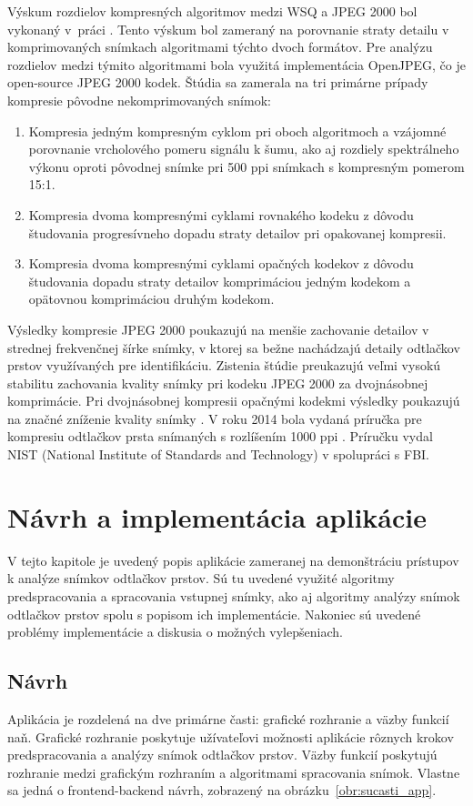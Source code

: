   Výskum rozdielov kompresných algoritmov medzi WSQ a JPEG 2000 bol vykonaný v~práci \cite{Libert}. Tento výskum bol zameraný na porovnanie straty detailu
  v komprimovaných snímkach algoritmami týchto dvoch formátov. Pre analýzu rozdielov medzi týmito algoritmami bola využitá implementácia OpenJPEG,
  čo je open-source JPEG 2000 kodek. Štúdia sa zamerala na tri primárne prípady kompresie pôvodne nekomprimovaných snímok:
  \begin{enumerate}
    \item Kompresia jedným kompresným cyklom pri oboch algoritmoch a vzájomné porovnanie vrcholového pomeru signálu k šumu, ako aj rozdiely spektrálneho
          výkonu oproti pôvodnej snímke pri 500 ppi snímkach s kompresným pomerom 15:1.
    \item Kompresia dvoma kompresnými cyklami rovnakého kodeku z dôvodu študovania progresívneho dopadu straty detailov pri opakovanej kompresii.
    \item Kompresia dvoma kompresnými cyklami opačných kodekov z dôvodu študovania dopadu straty detailov komprimáciou jedným kodekom a opätovnou komprimáciou
          druhým kodekom.
  \end{enumerate}
  Výsledky kompresie JPEG 2000 poukazujú na menšie zachovanie detailov v strednej frekvenčnej šírke snímky, v ktorej sa bežne nachádzajú detaily odtlačkov
  prstov využívaných pre identifikáciu. Zistenia štúdie preukazujú veľmi vysokú stabilitu zachovania kvality snímky pri kodeku JPEG 2000 za dvojnásobnej
  komprimácie. Pri dvojnásobnej kompresii opačnými kodekmi výsledky poukazujú na značné zníženie kvality snímky \cite{Libert}. V roku 2014 bola vydaná
  príručka pre kompresiu odtlačkov prsta snímaných s rozlíšením 1000 ppi \cite{orandi2014guidance}. Príručku vydal NIST (National Institute of Standards
  and Technology) v spolupráci s FBI.

\chapter{Návrh a implementácia aplikácie} \label{kap:navrh_appky}
  V tejto kapitole je uvedený popis aplikácie zameranej na demonštráciu prístupov k analýze snímkov odtlačkov prstov. Sú tu uvedené využité algoritmy
  predspracovania a spracovania vstupnej snímky, ako aj algoritmy analýzy snímok odtlačkov prstov spolu s popisom ich implementácie. Nakoniec sú uvedené
  problémy implementácie a diskusia o možných vylepšeniach.

  \section{Návrh}
  Aplikácia je rozdelená na dve primárne časti: grafické rozhranie a väzby funkcií naň. Grafické rozhranie poskytuje užívateľovi možnosti aplikácie
  rôznych krokov predspracovania a analýzy snímok odtlačkov prstov. Väzby funkcií poskytujú rozhranie medzi grafickým rozhraním a algoritmami spracovania
  snímok. Vlastne sa jedná o frontend-backend návrh, zobrazený na obrázku~{\ref{obr:sucasti_app}}.

